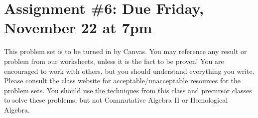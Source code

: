 \documentclass[12pt]{amsart}
\newcommand{\showsol}[1]{\def\displaysol{#1}}
\begin{document}
\showsol{1}
	
	\thispagestyle{empty}
	
	\section*{Assignment \#6: Due Friday, November 22 at 7pm}
	
	This problem set is to be turned in by Canvas. You may reference any result or problem from our worksheets, unless it is the fact to be proven! You are encouraged to work with others, but you should understand everything you write. Please consult the class website for acceptable/unacceptable resources for the problem sets. You should use the techniques from this class and precursor classes to solve these problems, but not Commutative Algebra II or Homological Algebra.
	
	
	\
	
\end{document}
